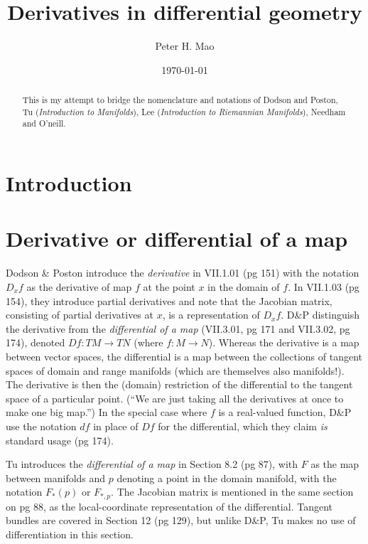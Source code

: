 \documentclass{article}
\begin{document}
\title{Derivatives in differential geometry}
\author{Peter H. Mao}
\date{\today}
\maketitle
\begin{abstract}
  This is my attempt to bridge the nomenclature and notations of Dodson and
  Poston, Tu (\emph{Introduction to Manifolds}), Lee (\emph{Introduction to
    Riemannian Manifolds}), Needham and O'neill.

\end{abstract}

\section{Introduction}

\section{Derivative or differential of a map}

Dodson \& Poston introduce the \emph{derivative} in VII.1.01 (pg 151) with the
notation $D_x f$ as the derivative of map $f$ at the point $x$ in the domain of
$f$.  In VII.1.03 (pg 154), they introduce partial derivatives and note that the
Jacobian matrix, consisting of partial derivatives at $x$, is a representation
of $D_x f$.  D\&P distinguish the derivative from the \emph{differential of a
  map} (VII.3.01, pg 171 and VII.3.02, pg 174), denoted
$Df\colon TM \rightarrow TN$ (where $f\colon M \rightarrow N$).  Whereas the
derivative is a map between vector spaces, the differential is a map between the
collections of tangent spaces of domain and range manifolds (which are
themselves also manifolds!).  The derivative is then the (domain) restriction of
the differential to the tangent space of a particular point. (``We are just
taking all the derivatives at once to make one big map.'')  In the special case
where $f$ is a real-valued function, D\&P use the notation $df$ in place of $Df$
for the differential, which they claim \emph{is} standard usage (pg 174).

Tu introduces the \emph{differential of a map} in Section 8.2 (pg 87), with $F$
as the map between manifolds and $p$ denoting a point in the domain manifold,
with the notation $F_*(p)$ or $F_{*,p}$.  The Jacobian matrix is mentioned in
the same section on pg 88, as the local-coordinate representation of the
differential.  Tangent bundles are covered in Section 12 (pg 129), but unlike
D\&P, Tu makes no use of differentiation in this section.
\end{document}

